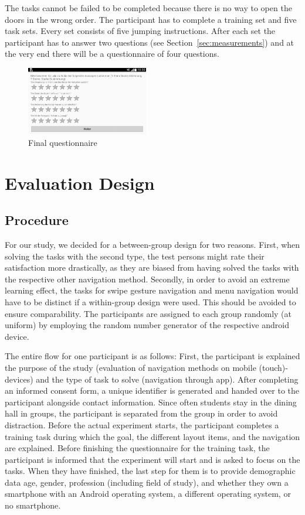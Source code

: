 \documentclass{sig-alternate-05-2015}
\begin{document}
The tasks cannot be failed to be completed because there is no way to open the doors in the wrong order. The participant has to complete a training set and five task sets. Every set consists of five jumping instructions. After each set the participant has to answer two questions (see Section~\ref{sec:measurements}) and at the very end there will be a questionnaire of four questions.
\begin{figure}
	\centering
	\includegraphics[width=0.475\textwidth]{pics/screenshots/global5-cut}
	\caption{Final questionnaire}\label{fig:final_questionnaire}
\end{figure}
\section{Evaluation Design}
\subsection{Procedure}
For our study, we decided for a between-group design for two reasons. First,
when solving the tasks with the second type, the test persons might rate their
satisfaction more drastically, as they are biased from having solved the tasks
with the respective other navigation method. Secondly, in order to avoid an
extreme learning effect, the tasks for swipe gesture navigation and menu
navigation would have to be distinct if a within-group design were used. This
should be avoided to ensure comparability. The participants are assigned to
each group randomly (at uniform) by employing the random number generator of
the respective android device.

The entire flow for one participant is as follows: First, the participant is explained
the purpose of the study (evaluation of navigation methods on mobile (touch)-devices) and the
type of task to solve (navigation through app). After completing an informed consent form, a unique
identifier is generated and handed over to the participant alongside contact information. Since often students
stay in the dining hall in groups, the participant is separated from the group in order to avoid distraction. 
Before the actual experiment starts, the participant completes a training task during which the goal, the
different layout items, and the navigation are explained. Before finishing the questionnaire for the training
task, the participant is informed that the experiment will start and is asked to focus on the tasks. When they have
finished, the last step for them is to provide demographic data age, gender, profession (including field of study),
and whether they own a smartphone with an Android operating system, a different operating system, or no smartphone.
\end{document}
